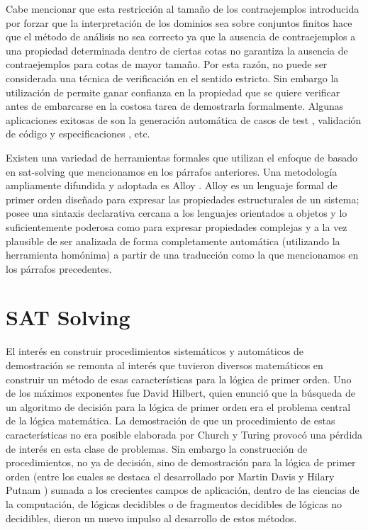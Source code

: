 Cabe mencionar que esta restricción al tamaño de los contraejemplos
introducida por forzar que la interpretación de los dominios sea sobre
conjuntos finitos hace que el método de análisis no sea correcto ya que la
ausencia de contraejemplos a una propiedad determinada dentro de ciertas cotas
no garantiza la ausencia de contraejemplos para cotas de mayor tamaño. Por
esta razón, \bmc no puede ser considerada una técnica de verificación en el
sentido estricto. Sin embargo la utilización de \bmc permite ganar confianza
en la propiedad que se quiere verificar antes de embarcarse en la costosa
tarea de demostrarla formalmente. Algunas aplicaciones exitosas de \bmc son la
generación automática de casos de test \cite{FAJITA??}, validación de código y
especificaciones \cite{galeotti:issta10}, etc.

Existen una variedad de herramientas formales que utilizan el enfoque de \bmc
basado en sat-solving que mencionamos en los párrafos anteriores. Una metodología
ampliamente difundida y adoptada es Alloy \cite{jackson:acmtosem-11_2}. Alloy es un lenguaje
formal de primer orden diseñado para expresar las propiedades estructurales de
un sistema; posee una sintaxis declarativa cercana a los lenguajes orientados
a objetos y lo suficientemente poderosa como para expresar propiedades
complejas y a la vez plausible de ser analizada de forma completamente
automática (utilizando la herramienta homónima) a partir de una traducción
como la que mencionamos en los párrafos precedentes.


\section{SAT Solving}

El interés en construir procedimientos sistemáticos y automáticos de
demostración se remonta al interés que tuvieron diversos matemáticos en
construir un método de esas características para la lógica de primer orden.
Uno de los máximos exponentes fue David Hilbert, quien enunció que la búsqueda
de un algoritmo de decisión para la lógica de primer orden era el problema
central de la lógica matemática. La demostración de que un procedimiento de estas características no
era posible elaborada por Church y Turing provocó una pérdida de interés en
esta clase de problemas. Sin embargo la construcción de procedimientos, no ya
de decisión, sino de demostración para la lógica de primer orden (entre los
cuales se destaca el desarrollado por Martin Davis y Hilary Putnam
\cite{Davis:1960:CPQ:321033.321034}) sumada a los crecientes campos de
aplicación, dentro de las ciencias de la computación, de lógicas decidibles o
de fragmentos decidibles de lógicas no decidibles, dieron un nuevo impulso al
desarrollo de estos métodos.

